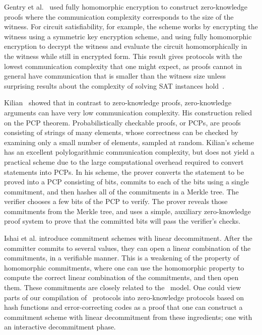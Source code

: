 Gentry et al.~\cite{FHENIZK} used fully homomorphic encryption to construct zero-knowledge proofs where the communication complexity corresponds to the size of the witness. For circuit satisfiability, for example, the scheme works by encrypting the witness using a symmetric key encryption scheme, and using fully homomorphic encryption to decrypt the witness and evaluate the circuit homomorphically in the witness while still in encrypted form. This result gives protocols with the lowest communication complexity that one might expect, as proofs cannot in general have communication that is smaller than the witness size unless surprising results about the complexity of solving SAT instances hold~\cite{Goldreich1998,Goldreich2002}.

Kilian~\cite{Kilian1992a} showed that in contrast to zero-knowledge proofs, zero-knowledge arguments can have very low communication complexity. His construction relied on the PCP theorem. Probabilistically checkable proofs, or PCPs, are proofs consisting of strings of many elements, whose correctness can be checked by examining only a small number of elements, sampled at random. Kilian's scheme has an excellent polylogarithmic communication complexity, but does not yield a practical scheme due to the large computational overhead required to convert statements into PCPs. In his scheme, the prover converts the statement to be proved into a PCP consisting of bits, commits to each of the bits using a single commitment, and then hashes all of the commitments in a Merkle tree. The verifier chooses a few bits of the PCP to verify. The prover reveals those commitments from the Merkle tree, and uses a simple, auxiliary zero-knowledge proof system to prove that the committed bits will pass the verifier's checks.

Ishai et al. \cite{Ishai2007} introduce commitment schemes with linear decommitment. After the committer commits to several values, they can open a linear combination of the commitments, in a verifiable manner. This is a weakening of the property of homomorphic commitments, where one can use the homomorphic property to compute the correct linear combination of the commitments, and then open them.  These commitments are closely related to the \ILC\ model. One could view parts of our compilation of \ILC\ protocols into zero-knowledge protocols based on hash functions and error-correcting codes as a proof that one can construct a commitment scheme with linear decommitment from these ingredients; one with an interactive decommitment phase.

